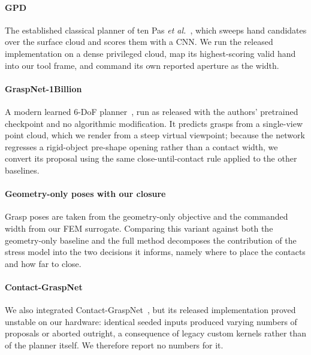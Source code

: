 \paragraph{GPD}
The established classical planner of ten Pas \emph{et al.}~\cite{gpd}, which sweeps hand
candidates over the surface cloud and scores them with a CNN. We run the released
implementation on a dense privileged cloud, map its highest-scoring valid hand into our tool
frame, and command its own reported aperture as the width.

\paragraph{GraspNet-1Billion}
A modern learned 6-DoF planner~\cite{gn1b}, run as released with the authors' pretrained
checkpoint and no algorithmic modification. It predicts grasps from a single-view point cloud,
which we render from a steep virtual viewpoint; because the network regresses a rigid-object
pre-shape opening rather than a contact width, we convert its proposal using the same
close-until-contact rule applied to the other baselines.

\paragraph{Geometry-only poses with our closure}
Grasp poses are taken from the geometry-only objective and the commanded width from our FEM
surrogate. Comparing this variant against both the geometry-only baseline and the full method
decomposes the contribution of the stress model into the two decisions it informs, namely where
to place the contacts and how far to close.

\paragraph{Contact-GraspNet}
We also integrated Contact-GraspNet~\cite{cgn}, but its released implementation proved
unstable on our hardware: identical seeded inputs produced varying numbers of proposals or
aborted outright, a consequence of legacy custom kernels rather than of the planner itself. We
therefore report no numbers for it.
